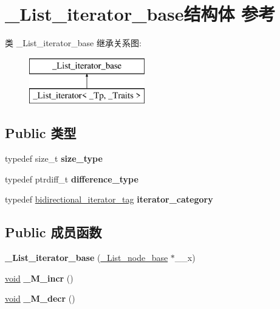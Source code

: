 \hypertarget{struct___list__iterator__base}{}\section{\+\_\+\+List\+\_\+iterator\+\_\+base结构体 参考}
\label{struct___list__iterator__base}
类 \+\_\+\+List\+\_\+iterator\+\_\+base 继承关系图\+:\begin{figure}[H]
\begin{center}
\leavevmode
\includegraphics[height=2.000000cm]{struct___list__iterator__base}
\end{center}
\end{figure}
\subsection*{Public 类型}
\begin{DoxyCompactItemize}
\item 
\mbox{\label{struct___list__iterator__base_ad4c3d81058991b17de51108c69389c20}} 
typedef size\+\_\+t {\bfseries size\+\_\+type}
\item 
\mbox{\label{struct___list__iterator__base_aea81b1dc201a2558bb96ac7543a0fe83}} 
typedef ptrdiff\+\_\+t {\bfseries difference\+\_\+type}
\item 
\mbox{\label{struct___list__iterator__base_a7cdd89b99219f0b45eef025e3b6917ae}} 
typedef \hyperlink{structbidirectional__iterator__tag}{bidirectional\+\_\+iterator\+\_\+tag} {\bfseries iterator\+\_\+category}
\end{DoxyCompactItemize}
\subsection*{Public 成员函数}
\begin{DoxyCompactItemize}
\item 
\mbox{\label{struct___list__iterator__base_a976c6aa8982239b04b488d68e19ecab8}} 
{\bfseries \+\_\+\+List\+\_\+iterator\+\_\+base} (\hyperlink{struct___list__node__base}{\+\_\+\+List\+\_\+node\+\_\+base} $\ast$\+\_\+\+\_\+x)
\item 
\mbox{\label{struct___list__iterator__base_ad3fd72968adf5657789153cb8e2c19d9}} 
\hyperlink{interfacevoid}{void} {\bfseries \+\_\+\+M\+\_\+incr} ()
\item 
\mbox{\label{struct___list__iterator__base_a20729e182099a4490b2f59621692390e}} 
\hyperlink{interfacevoid}{void} {\bfseries \+\_\+\+M\+\_\+decr} ()
\end{DoxyCompactItemize}
